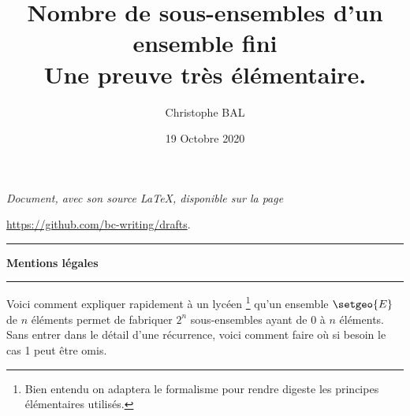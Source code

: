 \documentclass[12pt]{amsart}
\begin{document}
\title{Nombre de sous-ensembles d'un ensemble fini\\Une preuve très élémentaire.}
\author{Christophe BAL}
\date{19 Octobre 2020}


\maketitle

\begin{center}
	\itshape
	Document, avec son source \LaTeX, disponible sur la page
	
	\url{https://github.com/bc-writing/drafts}.
\end{center}


\bigskip


\begin{center}
	\hrule\vspace{.3em}
	{
		\fontsize{1.35em}{1em}\selectfont
		\textbf{Mentions \og légales \fg}
	}
			
	\vspace{0.45em}
	\doclicenseThis
	\hrule
\end{center}


\bigskip



Voici comment expliquer rapidement à un lycéen
\footnote{
	Bien entendu on adaptera le formalisme pour rendre digeste les principes élémentaires utilisés.
}
qu'un ensemble $\setgeo{E}$ de $n$ éléments permet de fabriquer $2^n$ sous-ensembles ayant de $0$ à $n$ éléments. Sans entrer dans le détail d'une récurrence, voici comment faire où si besoin le cas 1 peut être omis.
\end{document}
